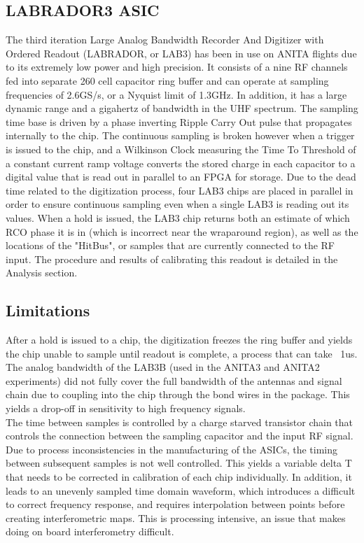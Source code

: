 	\subsection{LABRADOR3 ASIC}
		The third iteration Large Analog Bandwidth Recorder And Digitizer with Ordered Readout (LABRADOR, or LAB3) has been in use on ANITA flights due to its extremely low power and high precision.  It consists of a nine RF channels fed into separate 260 cell capacitor ring buffer and can operate at sampling frequencies of 2.6GS/s, or a Nyquist limit of 1.3GHz.  In addition, it has a large dynamic range and a gigahertz of bandwidth in the UHF spectrum.  The sampling time base is driven by a phase inverting Ripple Carry Out pulse that propagates internally to the chip.  The continuous sampling is broken however when a trigger is issued to the chip, and a Wilkinson Clock measuring the Time To Threshold of a constant current ramp voltage converts the stored charge in each capacitor to a digital value that is read out in parallel to an FPGA for storage.  Due to the dead time related to the digitization process, four LAB3 chips are placed in parallel in order to ensure continuous sampling even when a single LAB3 is reading out its values.  When a hold is issued, the LAB3 chip returns both an estimate of which RCO phase it is in (which is incorrect near the wraparound region), as well as the locations of the "HitBus", or samples that are currently connected to the RF input. The procedure and results of calibrating this readout is detailed in the Analysis section.
	
	
	\subsection{Limitations}
	After a hold is issued to a chip, the digitization freezes the ring buffer and yields the chip unable to sample until readout is complete, a process that can take ~1us. \\
	The analog bandwidth of the LAB3B (used in the ANITA3 and ANITA2 experiments) did not fully cover the full bandwidth of the antennas and signal chain due to coupling into the chip through the bond wires in the package.  This yields a drop-off in sensitivity to high frequency signals. \\
	The time between samples is controlled by a charge starved transistor chain that controls the connection between the sampling capacitor and the input RF signal.  Due to process inconsistencies in the manufacturing of the ASICs, the timing between subsequent samples is not well controlled.  This yields a variable delta T that needs to be corrected in calibration of each chip individually.  In addition, it leads to an unevenly sampled time domain waveform, which introduces a difficult to correct frequency response, and requires interpolation between points before creating interferometric maps.  This is processing intensive, an issue that makes doing on board interferometry difficult.
	
